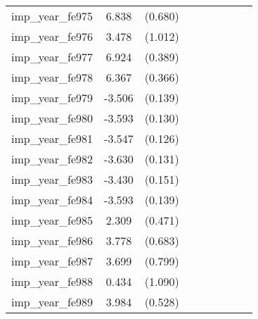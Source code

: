{\begin{tabular}{l*{4}{cc}}
imp\_year\_fe975&    6.838\sym{***}&  (0.680)&                  &         &                  &         &                  &         \\
imp\_year\_fe976&    3.478\sym{***}&  (1.012)&                  &         &                  &         &                  &         \\
imp\_year\_fe977&    6.924\sym{***}&  (0.389)&                  &         &                  &         &                  &         \\
imp\_year\_fe978&    6.367\sym{***}&  (0.366)&                  &         &                  &         &                  &         \\
imp\_year\_fe979&   -3.506\sym{***}&  (0.139)&                  &         &                  &         &                  &         \\
imp\_year\_fe980&   -3.593\sym{***}&  (0.130)&                  &         &                  &         &                  &         \\
imp\_year\_fe981&   -3.547\sym{***}&  (0.126)&                  &         &                  &         &                  &         \\
imp\_year\_fe982&   -3.630\sym{***}&  (0.131)&                  &         &                  &         &                  &         \\
imp\_year\_fe983&   -3.430\sym{***}&  (0.151)&                  &         &                  &         &                  &         \\
imp\_year\_fe984&   -3.593\sym{***}&  (0.139)&                  &         &                  &         &                  &         \\
imp\_year\_fe985&    2.309\sym{***}&  (0.471)&                  &         &                  &         &                  &         \\
imp\_year\_fe986&    3.778\sym{***}&  (0.683)&                  &         &                  &         &                  &         \\
imp\_year\_fe987&    3.699\sym{***}&  (0.799)&                  &         &                  &         &                  &         \\
imp\_year\_fe988&    0.434         &  (1.090)&                  &         &                  &         &                  &         \\
imp\_year\_fe989&    3.984\sym{***}&  (0.528)&                  &         &                  &         &                  &         \\

\end{tabular}}
